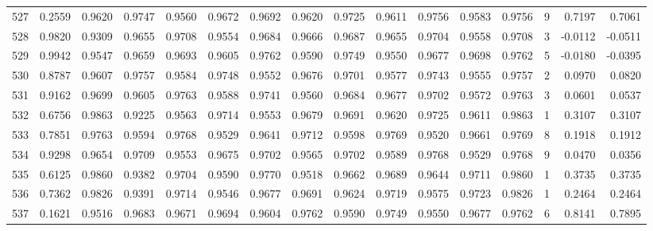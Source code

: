 \begin{tabular}{lrrrrrrrrrrrrrrr}
527 &      0.2559 &  0.9620 &  0.9747 &  0.9560 &  0.9672 &  0.9692 &  0.9620 &  0.9725 &  0.9611 &  0.9756 &   0.9583 &     0.9756 &      9 &                    0.7197 &                     0.7061 \\
528 &      0.9820 &  0.9309 &  0.9655 &  0.9708 &  0.9554 &  0.9684 &  0.9666 &  0.9687 &  0.9655 &  0.9704 &   0.9558 &     0.9708 &      3 &                   -0.0112 &                    -0.0511 \\
529 &      0.9942 &  0.9547 &  0.9659 &  0.9693 &  0.9605 &  0.9762 &  0.9590 &  0.9749 &  0.9550 &  0.9677 &   0.9698 &     0.9762 &      5 &                   -0.0180 &                    -0.0395 \\
530 &      0.8787 &  0.9607 &  0.9757 &  0.9584 &  0.9748 &  0.9552 &  0.9676 &  0.9701 &  0.9577 &  0.9743 &   0.9555 &     0.9757 &      2 &                    0.0970 &                     0.0820 \\
531 &      0.9162 &  0.9699 &  0.9605 &  0.9763 &  0.9588 &  0.9741 &  0.9560 &  0.9684 &  0.9677 &  0.9702 &   0.9572 &     0.9763 &      3 &                    0.0601 &                     0.0537 \\
532 &      0.6756 &  0.9863 &  0.9225 &  0.9563 &  0.9714 &  0.9553 &  0.9679 &  0.9691 &  0.9620 &  0.9725 &   0.9611 &     0.9863 &      1 &                    0.3107 &                     0.3107 \\
533 &      0.7851 &  0.9763 &  0.9594 &  0.9768 &  0.9529 &  0.9641 &  0.9712 &  0.9598 &  0.9769 &  0.9520 &   0.9661 &     0.9769 &      8 &                    0.1918 &                     0.1912 \\
534 &      0.9298 &  0.9654 &  0.9709 &  0.9553 &  0.9675 &  0.9702 &  0.9565 &  0.9702 &  0.9589 &  0.9768 &   0.9529 &     0.9768 &      9 &                    0.0470 &                     0.0356 \\
535 &      0.6125 &  0.9860 &  0.9382 &  0.9704 &  0.9590 &  0.9770 &  0.9518 &  0.9662 &  0.9689 &  0.9644 &   0.9711 &     0.9860 &      1 &                    0.3735 &                     0.3735 \\
536 &      0.7362 &  0.9826 &  0.9391 &  0.9714 &  0.9546 &  0.9677 &  0.9691 &  0.9624 &  0.9719 &  0.9575 &   0.9723 &     0.9826 &      1 &                    0.2464 &                     0.2464 \\
537 &      0.1621 &  0.9516 &  0.9683 &  0.9671 &  0.9694 &  0.9604 &  0.9762 &  0.9590 &  0.9749 &  0.9550 &   0.9677 &     0.9762 &      6 &                    0.8141 &                     0.7895 \\

\end{tabular}
